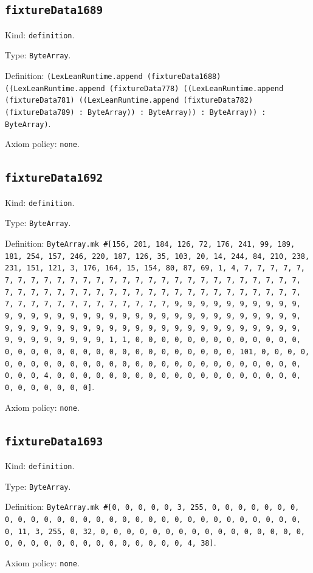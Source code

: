 \documentclass[11pt]{article}
\begin{document}
\subsection*{\texttt{fixtureData1689}}
\noindent Kind: \texttt{definition}.\par
\noindent Type: \texttt{ByteArray}.\par
\noindent Definition: \texttt{(LexLeanRuntime.append (fixtureData1688) ((LexLeanRuntime.append (fixtureData778) ((LexLeanRuntime.append (fixtureData781) ((LexLeanRuntime.append (fixtureData782) (fixtureData789) : ByteArray)) : ByteArray)) : ByteArray)) : ByteArray)}.\par
\noindent Axiom policy: \texttt{none}.\par
\subsection*{\texttt{fixtureData1692}}
\noindent Kind: \texttt{definition}.\par
\noindent Type: \texttt{ByteArray}.\par
\noindent Definition: \texttt{ByteArray.mk \#[156, 201, 184, 126, 72, 176, 241, 99, 189, 181, 254, 157, 246, 220, 187, 126, 35, 103, 20, 14, 244, 84, 210, 238, 231, 151, 121, 3, 176, 164, 15, 154, 80, 87, 69, 1, 4, 7, 7, 7, 7, 7, 7, 7, 7, 7, 7, 7, 7, 7, 7, 7, 7, 7, 7, 7, 7, 7, 7, 7, 7, 7, 7, 7, 7, 7, 7, 7, 7, 7, 7, 7, 7, 7, 7, 7, 7, 7, 7, 7, 7, 7, 7, 7, 7, 7, 7, 7, 7, 7, 7, 7, 7, 7, 7, 7, 7, 7, 7, 7, 7, 9, 9, 9, 9, 9, 9, 9, 9, 9, 9, 9, 9, 9, 9, 9, 9, 9, 9, 9, 9, 9, 9, 9, 9, 9, 9, 9, 9, 9, 9, 9, 9, 9, 9, 9, 9, 9, 9, 9, 9, 9, 9, 9, 9, 9, 9, 9, 9, 9, 9, 9, 9, 9, 9, 9, 9, 9, 9, 9, 9, 9, 9, 9, 9, 1, 1, 0, 0, 0, 0, 0, 0, 0, 0, 0, 0, 0, 0, 0, 0, 0, 0, 0, 0, 0, 0, 0, 0, 0, 0, 0, 0, 0, 0, 0, 0, 0, 101, 0, 0, 0, 0, 0, 0, 0, 0, 0, 0, 0, 0, 0, 0, 0, 0, 0, 0, 0, 0, 0, 0, 0, 0, 0, 0, 0, 0, 0, 0, 4, 0, 0, 0, 0, 0, 0, 0, 0, 0, 0, 0, 0, 0, 0, 0, 0, 0, 0, 0, 0, 0, 0, 0, 0, 0, 0]}.\par
\noindent Axiom policy: \texttt{none}.\par
\subsection*{\texttt{fixtureData1693}}
\noindent Kind: \texttt{definition}.\par
\noindent Type: \texttt{ByteArray}.\par
\noindent Definition: \texttt{ByteArray.mk \#[0, 0, 0, 0, 0, 3, 255, 0, 0, 0, 0, 0, 0, 0, 0, 0, 0, 0, 0, 0, 0, 0, 0, 0, 0, 0, 0, 0, 0, 0, 0, 0, 0, 0, 0, 0, 0, 0, 11, 3, 255, 0, 32, 0, 0, 0, 0, 0, 0, 0, 0, 0, 0, 0, 0, 0, 0, 0, 0, 0, 0, 0, 0, 0, 0, 0, 0, 0, 0, 0, 0, 0, 0, 4, 38]}.\par
\noindent Axiom policy: \texttt{none}.\par
\end{document}
